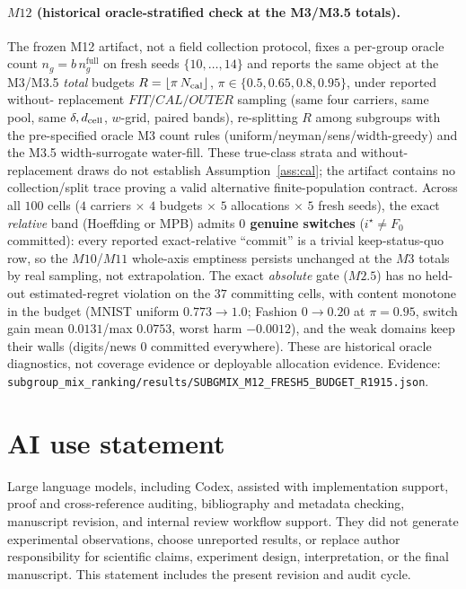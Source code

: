 \documentclass{article}
\begin{document}
\paragraph{$M12$ (historical oracle-stratified check at the M3/M3.5 totals).}
The frozen M12 artifact, not a field collection protocol, fixes a per-group oracle count
$n_g=b\,n_g^{\mathrm{full}}$ on fresh seeds $\{10,\dots,14\}$ and reports the same object at the M3/M3.5 \emph{total}
budgets $R=\lfloor\pi\,N_{\rm cal}\rfloor$, $\pi\in\{0.5,0.65,0.8,0.95\}$, under reported without-
replacement $FIT/CAL/OUTER$ sampling (same four carriers, same pool, same $\delta,d_{\rm cell}$,
$w$-grid, paired bands), re-splitting $R$ among subgroups with the pre-specified oracle M3 count rules
(uniform/neyman/sens/width-greedy) and the M3.5 width-surrogate water-fill. These true-class
strata and without-replacement draws do not establish Assumption~\ref{ass:cal}; the artifact
contains no collection/split trace proving a valid alternative finite-population contract. Across all $100$ cells
($4$ carriers $\times$ $4$ budgets $\times$ $5$ allocations $\times$ $5$ fresh seeds), the exact
\emph{relative} band (Hoeffding or MPB) admits \textbf{$0$ genuine switches} ($i^\star\!\ne\!F_0$
committed): every reported exact-relative ``commit'' is a trivial keep-status-quo row, so the $M10$/$
M11$ whole-axis emptiness persists unchanged at the $M3$ totals by real sampling, not extrapolation.
The exact \emph{absolute} gate ($M2.5$) has no held-out estimated-regret violation on the $37$ committing cells, with
content monotone in the budget (MNIST uniform $0.773\!\to\!1.0$; Fashion $0\!\to\!0.20$ at $\pi{=}0.95$,
switch gain mean $0.0131$/max $0.0753$, worst harm $-0.0012$), and the weak domains keep their walls
(digits/news $0$ committed everywhere). These are historical oracle diagnostics, not coverage
evidence or deployable allocation evidence. Evidence:
\texttt{subgroup\_mix\_ranking/results/SUBGMIX\_M12\_FRESH5\_BUDGET\_R1915.json}.

\section{AI use statement}
Large language models, including Codex, assisted with implementation support, proof and
cross-reference auditing, bibliography and metadata checking, manuscript revision, and
internal review workflow support. They did not generate experimental observations, choose
unreported results, or replace author responsibility for scientific claims, experiment design,
interpretation, or the final manuscript. This statement includes the present revision and
audit cycle.
\end{document}
